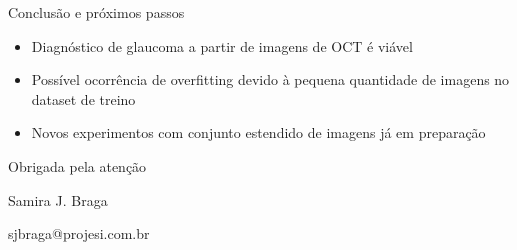 \documentclass{beamer}
\begin{document}
\begin{frame}{Conclusão e próximos passos}
    \begin{itemize}
        \item Diagnóstico de glaucoma a partir de imagens de OCT é viável
        \item Possível ocorrência de overfitting devido à pequena quantidade de imagens no dataset de treino
        \item Novos experimentos com conjunto estendido de imagens já em preparação
    \end{itemize}
\end{frame}

\begin{frame}[focus]
    Obrigada pela atenção 
    \vfill
    {\small Samira J. Braga

    sjbraga@projesi.com.br}
\end{frame}


\end{document}
